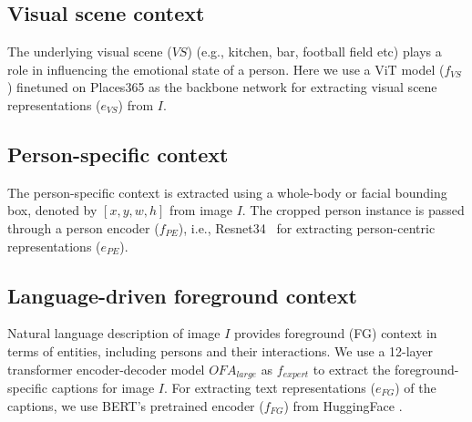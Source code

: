 \subsection{Visual scene context}
The underlying visual scene ($VS$) (e.g.,  kitchen, bar, football field etc) plays a role in influencing the emotional state of a person. Here we use a ViT \cite{Dosovitskiy2021AnII} model ($f_{VS}$) finetuned on Places365 \cite{zhou2017places} as the backbone network for extracting visual scene representations ($e_{VS}$) from $I$.
\subsection{Person-specific context}
The person-specific context is extracted using a whole-body or facial bounding box, denoted by $[x,y,w,h]$ from image $I$. The cropped person instance is passed through a person encoder ($f_{PE}$), i.e., Resnet34~\cite{He2016DeepRL} for extracting person-centric representations ($e_{PE}$). 
\subsection{Language-driven foreground context}
 Natural language description of image $I$ provides foreground (FG) context in terms of entities, including persons and their interactions. We use a 12-layer transformer encoder-decoder model $OFA_{large}$ \cite{wang2022ofa} as $f_{expert}$ to extract the foreground-specific captions for image $I$. For extracting text representations ($e_{FG}$) of the captions, we use BERT's \cite{Devlin2019BERT} pretrained encoder ($f_{FG}$) from HuggingFace \cite{wolf-etal-2020-transformers}.
